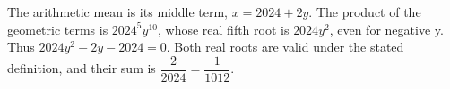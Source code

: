 The arithmetic mean is its middle term, $x=2024+2y$. The product of the geometric terms is $2024^5y^{10}$, whose real fifth root is $2024y^2$, even for negative y. Thus $2024y^2-2y-2024=0$. Both real roots are valid under the stated definition, and their sum is $\dfrac{2}{2024}=\boxed{\dfrac{1}{1012}}$.
